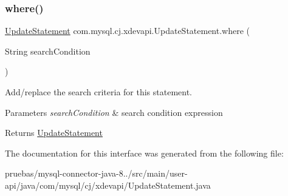 \subsubsection{\texorpdfstring{where()}{where()}}
{\footnotesize\ttfamily \mbox{\hyperlink{interfacecom_1_1mysql_1_1cj_1_1xdevapi_1_1_update_statement}{Update\+Statement}} com.\+mysql.\+cj.\+xdevapi.\+Update\+Statement.\+where (\begin{DoxyParamCaption}\item[{String}]{search\+Condition }\end{DoxyParamCaption})}

Add/replace the search criteria for this statement.


\begin{DoxyParams}{Parameters}
{\em search\+Condition} & search condition expression \\
\hline
\end{DoxyParams}
\begin{DoxyReturn}{Returns}
\mbox{\hyperlink{interfacecom_1_1mysql_1_1cj_1_1xdevapi_1_1_update_statement}{Update\+Statement}} 
\end{DoxyReturn}


The documentation for this interface was generated from the following file\+:\begin{DoxyCompactItemize}
\item 
pruebas/mysql-\/connector-\/java-\/8../src/main/user-\/api/java/com/mysql/cj/xdevapi/Update\+Statement.\+java\end{DoxyCompactItemize}
